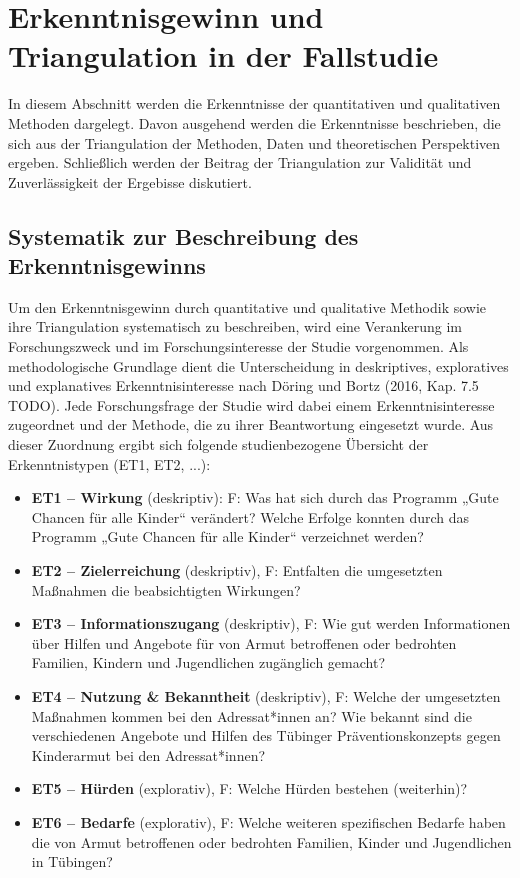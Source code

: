 \section{Erkenntnisgewinn und Triangulation in der Fallstudie}

In diesem Abschnitt werden die Erkenntnisse der quantitativen und qualitativen Methoden dargelegt. Davon ausgehend werden die Erkenntnisse beschrieben, die sich aus der Triangulation der Methoden, Daten und theoretischen Perspektiven ergeben. Schließlich werden der Beitrag der Triangulation zur Validität und Zuverlässigkeit der Ergebisse diskutiert.

\subsection{Systematik zur Beschreibung des Erkenntnisgewinns}

Um den Erkenntnisgewinn durch quantitative und qualitative Methodik sowie 
ihre Triangulation systematisch zu beschreiben, wird eine Verankerung im 
Forschungszweck und im Forschungsinteresse der Studie vorgenommen. Als 
methodologische Grundlage dient die Unterscheidung in  
deskriptives, exploratives und explanatives Erkenntnisinteresse nach Döring und Bortz (2016, Kap. 7.5 TODO). Jede Forschungsfrage der Studie wird dabei einem 
Erkenntnisinteresse zugeordnet und der Methode, die zu ihrer Beantwortung 
eingesetzt wurde. Aus dieser Zuordnung ergibt sich folgende 
studienbezogene Übersicht der Erkenntnistypen (ET1, ET2, ...):

\begin{itemize}
  \item \textbf{ET1 – Wirkung} (deskriptiv): F: Was hat sich durch das Programm „Gute Chancen für alle Kinder“ verändert? Welche Erfolge konnten durch das Programm „Gute Chancen für alle Kinder“ verzeichnet werden?
  \item \textbf{ET2 – Zielerreichung} (deskriptiv), F: Entfalten die umgesetzten Maßnahmen die beabsichtigten Wirkungen?
  \item \textbf{ET3 – Informationszugang} (deskriptiv), F: Wie gut werden Informationen über Hilfen und Angebote für von Armut betroffenen oder bedrohten Familien, Kindern und Jugendlichen zugänglich gemacht?
  \item \textbf{ET4 – Nutzung \& Bekanntheit} (deskriptiv), F: Welche der umgesetzten Maßnahmen kommen bei den Adressat*innen an? Wie bekannt sind die verschiedenen Angebote und Hilfen des Tübinger Präventionskonzepts gegen Kinderarmut bei den Adressat*innen?
  \item \textbf{ET5 – Hürden} (explorativ), F: Welche Hürden bestehen (weiterhin)?
  \item \textbf{ET6 – Bedarfe} (explorativ), F: Welche weiteren spezifischen Bedarfe haben die von Armut betroffenen oder bedrohten Familien, Kinder und Jugendlichen in Tübingen?
\end{itemize}


